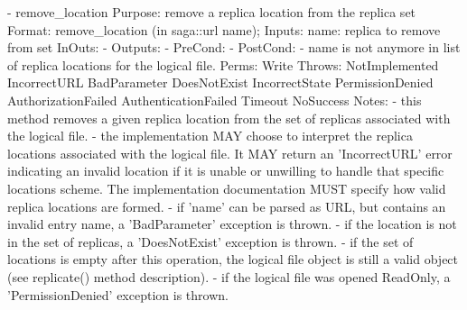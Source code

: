 \begin{myspec}
 
    - remove_location
      Purpose:  remove a replica location from the replica set
      Format:   remove_location  (in  saga::url name);
      Inputs:   name:             replica to remove from set
      InOuts:   -
      Outputs:  -
      PreCond:  -
      PostCond: - name is not anymore in list of replica 
                  locations for the logical file.
      Perms:    Write
      Throws:   NotImplemented
                IncorrectURL
                BadParameter
                DoesNotExist
                IncorrectState
                PermissionDenied
                AuthorizationFailed
                AuthenticationFailed
                Timeout
                NoSuccess
      Notes:    - this method removes a given replica location 
                  from the set of replicas associated with the 
                  logical file.
                - the implementation MAY choose to interpret the
                  replica locations associated with the logical 
                  file.  It MAY return an 'IncorrectURL' error 
                  indicating an invalid location if it is unable 
                  or unwilling to handle that specific locations
                  scheme.  The implementation documentation MUST 
                  specify how valid replica locations are formed.
                - if 'name' can be parsed as URL, but contains 
                  an invalid entry name, a 'BadParameter'
                  exception is thrown.
                - if the location is not in the set of
                  replicas, a 'DoesNotExist' exception is 
                  thrown.
                - if the set of locations is empty after this
                  operation, the logical file object is still 
                  a valid object (see replicate() method
                  description).
                - if the logical file was opened ReadOnly, a
                  'PermissionDenied' exception is thrown.
 

\end{myspec}
